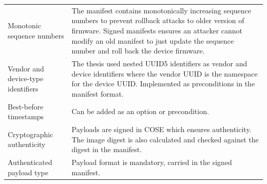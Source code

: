 \documentclass[0-thesis.tex]{subfiles}
\begin{document}
\begin{small}
\begin{longtable}[]{@{}ll@{}}
    \begin{minipage}[t]{0.37\columnwidth}\raggedright\strut
    Monotonic sequence numbers\strut
    \end{minipage} & \begin{minipage}[t]{0.57\columnwidth}\raggedright\strut
    The manifest contains monotonically increasing sequence numbers to
    prevent rollback attacks to older version of firmware. Signed manifests
    ensures an attacker cannot modify an old manifest to just update the
    sequence number and roll back the device firmware.\strut
    \end{minipage}\tabularnewline
    \begin{minipage}[t]{0.37\columnwidth}\raggedright\strut
    Vendor and device-type identifiers\strut
    \end{minipage} & \begin{minipage}[t]{0.57\columnwidth}\raggedright\strut
    The thesis used nested UUID5 identifiers as vendor and device
    identifiers where the vendor UUID is the namespace for the device UUID.
    Implemented as preconditions in the manifest format.\strut
    \end{minipage}\tabularnewline
    \begin{minipage}[t]{0.37\columnwidth}\raggedright\strut
    Best-before timestamps\strut
    \end{minipage} & \begin{minipage}[t]{0.57\columnwidth}\raggedright\strut
    Can be added as an option or precondition.\strut
    \end{minipage}\tabularnewline
    \begin{minipage}[t]{0.37\columnwidth}\raggedright\strut
    Cryptographic authenticity\strut
    \end{minipage} & \begin{minipage}[t]{0.57\columnwidth}\raggedright\strut
    Payloads are signed in COSE which ensures authenticity. The image digest
    is also calculated and checked against the digest in the manifest.\strut
    \end{minipage}\tabularnewline
    \begin{minipage}[t]{0.37\columnwidth}\raggedright\strut
    Authenticated payload type\strut
    \end{minipage} & \begin{minipage}[t]{0.57\columnwidth}\raggedright\strut
    Payload format is mandatory, carried in the signed manifest.\strut
    \end{minipage}\tabularnewline

\end{longtable}
\end{small}
\end{document}
